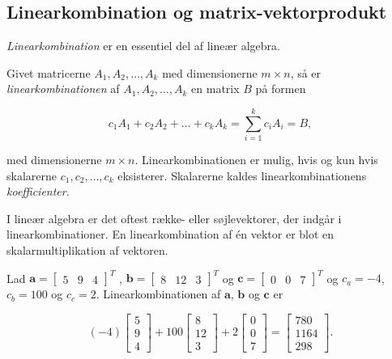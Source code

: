 \subsection{Linearkombination og matrix-vektorprodukt}

\textit{Linearkombination} er en essentiel del af lineær algebra. 

\begin{defn}{}{}
Givet matricerne $A_1, A_2, \ldots, A_k$ med dimensionerne $m \times n$, så er \textit{linearkombinationen} af $A_1, A_2, \ldots, A_k$ en matrix $B$ på formen 

$$c_1A_1+c_2A_2+\ldots+c_kA_k=\sum\limits_{i=1}^k c_iA_i=B,$$

med dimensionerne $m \times n$. 
Linearkombinationen er mulig, hvis og kun hvis skalarerne $c_1, c_2, \ldots, c_k$ eksisterer. 
Skalarerne kaldes linearkombinationens \textit{koefficienter}.
\end{defn}

I lineær algebra er det oftest række- eller søjlevektorer, der indgår i linearkombinationer. 
En linearkombination af én vektor er blot en skalarmultiplikation af vektoren.

\begin{eks}
Lad 
$
\textbf{a}=
\begin{bmatrix}
5 & 9 & 4
\end{bmatrix}^T
$
,
$
\textbf{b}=
\begin{bmatrix}
8 & 12 & 3
\end{bmatrix}^T
$
og
$\textbf{c}=
\begin{bmatrix}
0 & 0 & 7
\end{bmatrix}^T
$ 
og $c_a=-4$, $c_b=100$ og $c_c=2$. Linearkombinationen af $\textbf{a}$, $\textbf{b}$ og $\textbf{c}$ er 

$$
(-4)
\begin{bmatrix}
5 \\ 
9 \\ 
4
\end{bmatrix}
+
100
\begin{bmatrix}
8 \\
12 \\ 
3
\end{bmatrix}
+
2
\begin{bmatrix}
0 \\
0 \\ 
7
\end{bmatrix}
=
\begin{bmatrix}
780 \\
1164 \\ 
298
\end{bmatrix}
\text{.}
$$

\end{eks}

